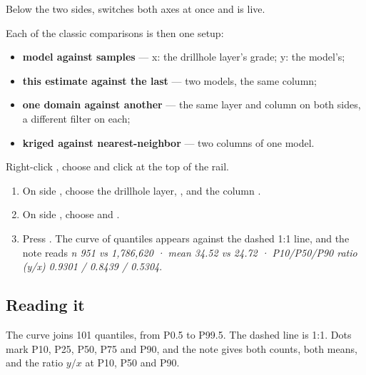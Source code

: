 Below the two sides,  switches both axes at once and is live.

Each of the classic comparisons is then one setup:

\begin{itemize}
\item \textbf{model against samples} — x: the drillhole layer's grade; y: the model's;
\item \textbf{this estimate against the last} — two models, the same column;
\item \textbf{one domain against another} — the same layer and column on both sides, a different filter on each;
\item \textbf{kriged against nearest-neighbor} — two columns of one model.
\end{itemize}

\begin{tryit}
Right-click , choose  and click  at the top of the rail.
\begin{enumerate}
\item On side , choose the drillhole layer, , and the column .
\item On side , choose  and .
\item Press . The curve of quantiles appears against the dashed 1:1 line, and the note reads \emph{n 951 vs 1,786,620 · mean 34.52 vs 24.72 · P10/P50/P90 ratio (y/x) 0.9301 / 0.8439 / 0.5304}.
\end{enumerate}
\end{tryit}


\subsection{Reading it}
The curve joins 101 quantiles, from P0.5 to P99.5. The dashed line is 1:1. Dots mark P10, P25, P50, P75 and P90, and the note gives both counts, both means, and the ratio $y/x$ at P10, P50 and P90.

